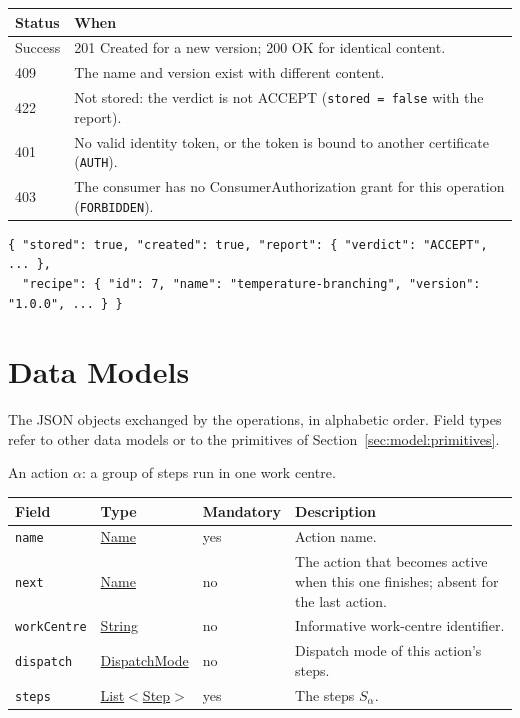 \documentclass[a4paper]{arrowhead}
\newcommand{\mref}[1]{{\textcolor{ArrowheadPurple}{\hyperref[sec:model:#1]{#1}}}}
\newcommand{\pref}[1]{{\textcolor{ArrowheadGrey}{\hyperref[sec:model:primitives:#1]{#1}}}}
\begin{document}
{\small
\begin{longtable}{|p{2.0cm}|p{13.8cm}|}

\hline
\rowcolor{gray!33} Status & When \\ \hline
\endhead
Success & 201 Created for a new version; 200 OK for identical content. \\ \hline
409 & The name and version exist with different content. \\ \hline
422 & Not stored: the verdict is not ACCEPT (\texttt{stored = false} with the report). \\ \hline
401 & No valid identity token, or the token is bound to another certificate (\texttt{AUTH}). \\ \hline
403 & The consumer has no ConsumerAuthorization grant for this operation (\texttt{FORBIDDEN}). \\ \hline
\end{longtable}
}


\begin{lstlisting}[caption={Example response body}]
{ "stored": true, "created": true, "report": { "verdict": "ACCEPT", ... },
  "recipe": { "id": 7, "name": "temperature-branching", "version": "1.0.0", ... } }
\end{lstlisting}


\newpage
\section{Data Models}
\label{sec:model}
The JSON objects exchanged by the operations, in alphabetic order. Field types refer to other data models or to the
primitives of Section~\ref{sec:model:primitives}.

An action $\alpha$: a group of steps run in one work centre.

{\small
\begin{longtable}{|p{3.7cm}|p{4.2cm}|p{1.6cm}|p{6.3cm}|}

\hline
\rowcolor{gray!33} Field & Type & Mandatory & Description \\ \hline
\endhead
\texttt{name} & \pref{Name} & yes & Action name. \\ \hline
\texttt{next} & \pref{Name} & no & The action that becomes active when this one finishes; absent for the last action. \\ \hline
\texttt{workCentre} & \pref{String} & no & Informative work-centre identifier. \\ \hline
\texttt{dispatch} & \mref{DispatchMode} & no & Dispatch mode of this action's steps. \\ \hline
\texttt{steps} & \pref{List}$<$\mref{Step}$>$ & yes & The steps $S_\alpha$. \\ \hline
\end{longtable}
}
\end{document}
